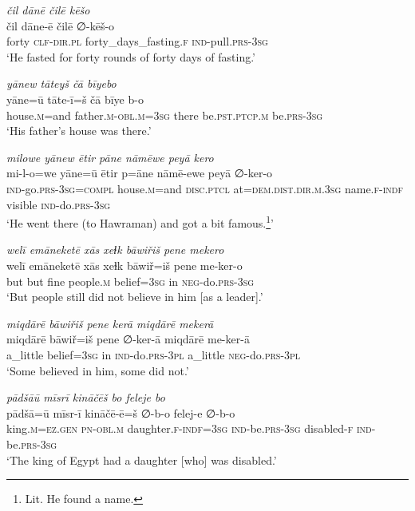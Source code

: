 \ea \label{ŽP.140}
\textit{čil dānē čilē kēšo} \\ 
\gll čil dāne-ē čilē ∅-kēš-o \\ 
 forty \textsc{clf}\textsc{-dir}\textsc{.pl} forty\_days\_fasting\textsc{.f} \textsc{ind-}pull\textsc{.prs}\textsc{-3sg} \\ 
\glt `He fasted for forty rounds of forty days of fasting.'
\z 
 
\ea \label{ŽP.142}
\textit{yānew tāteyš čā bīyebo} \\ 
\gll yāne=ū tāte-ī=š čā bīye b-o \\ 
 house\textsc{.m}=and father\textsc{.m}\textsc{-obl}\textsc{.m}\textsc{=3sg} there be\textsc{.pst}\textsc{.ptcp}\textsc{.m} be\textsc{.prs}\textsc{-3sg} \\ 
\glt `His father’s house was there.'
\z 
 
\ea \label{ŽP.143}
\textit{milowe yānew ētir pāne nāmēwe peyā kero} \\ 
\gll mi-l-o=we yāne=ū ētir p=āne nāmē-ewe peyā ∅-ker-o \\ 
 \textsc{ind-}go\textsc{.prs}\textsc{-3sg}\textsc{=compl} house\textsc{.m}=and \textsc{disc.ptcl} at=\textsc{dem.dist}\textsc{.dir}\textsc{.m}\textsc{.3sg} name\textsc{.f}\textsc{-indf} visible \textsc{ind-}do\textsc{.prs}\textsc{-3sg} \\ 
\glt `He went there (to Hawraman) and got a bit famous.\footnote{Lit. He found a name.}'
\z 
 
\ea \label{ŽP.144}
\textit{welī emāneketē xās xeɫk bāwiřiš pene mekero} \\ 
\gll welī emāneketē xās xeɫk bāwiř=iš pene me-ker-o \\ 
 but but fine people\textsc{.m} belief\textsc{=3sg} in \textsc{neg-}do\textsc{.prs}\textsc{-3sg} \\ 
\glt `But people still did not believe in him [as a leader].'
\z 
 
\ea \label{ŽP.145}
\textit{miqdārē bāwiřiš pene kerā miqdārē mekerā} \\ 
\gll miqdārē bāwiř=iš pene ∅-ker-ā miqdārē me-ker-ā \\ 
 a\_little belief\textsc{=3sg} in \textsc{ind-}do\textsc{.prs}\textsc{-3pl} a\_little \textsc{neg-}do\textsc{.prs}\textsc{-3pl} \\ 
\glt `Some believed in him, some did not.'
\z 
 
\ea \label{ŽP.146}
\textit{pādšāū mīsrī kināčēš bo feleje bo} \\ 
\gll pādšā=ū mīsr-ī kināčē-ē=š ∅-b-o felej-e ∅-b-o \\ 
 king\textsc{.m}\textsc{\textsc{=ez.gen}} \textsc{pn}\textsc{-obl}\textsc{.m} daughter\textsc{.f}\textsc{-indf}\textsc{=3sg} \textsc{ind-}be\textsc{.prs}\textsc{-3sg} disabled\textsc{-f} \textsc{ind-}be\textsc{.prs}\textsc{-3sg} \\ 
\glt `The king of Egypt had a daughter [who] was disabled.'
\z 
 
